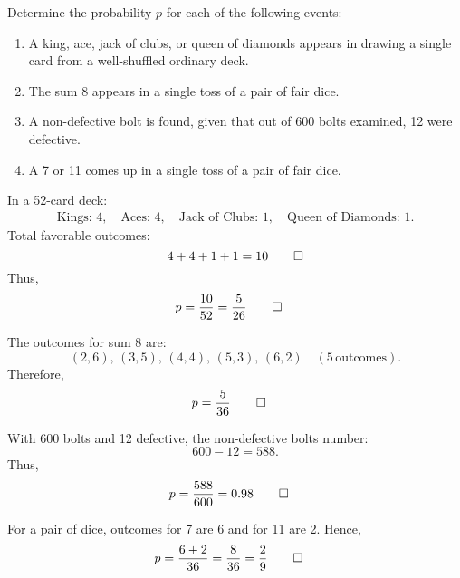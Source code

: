 \begin{hwkProblem}{5}{}

	Determine the probability \(p\) for each of the following events:
	\begin{enumerate}
		\item A king, ace, jack of clubs, or queen of diamonds appears in drawing a single card from a well-shuffled ordinary deck.
		\item The sum 8 appears in a single toss of a pair of fair dice.
		\item A non-defective bolt is found, given that out of 600 bolts examined, 12 were defective.
		\item A 7 or 11 comes up in a single toss of a pair of fair dice.
	\end{enumerate}

	\hwkSol

	\hwkPart

	In a 52-card deck:
	\begin{align*}
		\text{Kings: }4,\quad \text{Aces: }4,\quad \text{Jack of Clubs: }1,\quad \text{Queen of Diamonds: }1.
	\end{align*}
	Total favorable outcomes: 
	\[
		4+4+1+1=10 \qed
	\]
	Thus,
	\begin{align*}
		p &= \frac{10}{52} = \frac{5}{26} \qed
	\end{align*}

	\hwkPart

	The outcomes for sum 8 are:
	\[
		(2,6),\,(3,5),\,(4,4),\,(5,3),\,(6,2) \quad (5\,\text{outcomes}).
	\]
	Therefore,
	\begin{align*}
		p &= \frac{5}{36} \qed
	\end{align*}

	\hwkPart

	With 600 bolts and 12 defective, the non-defective bolts number:
	\[
		600-12=588.
	\]
	Thus,
	\begin{align*}
		p &= \frac{588}{600} = 0.98 \qed
	\end{align*}

	\hwkPart

	For a pair of dice, outcomes for 7 are 6 and for 11 are 2. Hence,
	\begin{align*}
		p &= \frac{6+2}{36} = \frac{8}{36} = \frac{2}{9} \qed
	\end{align*}

\end{hwkProblem}


